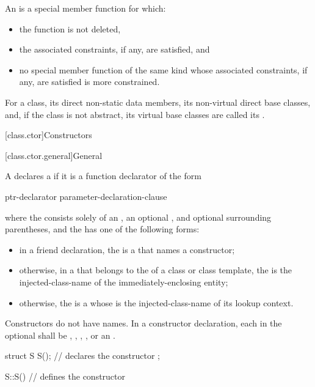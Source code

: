 \pnum
An  is a special member function for which:
\begin{itemize}
\item the function is not deleted,
\item the associated constraints, if any, are satisfied, and
\item no special member function of the same kind
whose associated constraints, if any, are satisfied
is more constrained.
\end{itemize}

\pnum
For a class, its direct non-static data members, its non-virtual direct base classes,
and, if the class is not abstract, its virtual base
classes are called its .

[class.ctor]{Constructors}%

[class.ctor.general]{General}%
%
%

\pnum
A  declares a  if it is a
function declarator of the form
\begin{ncbnf}
ptr-declarator \terminal{(} parameter-declaration-clause \terminal{)}  
\end{ncbnf}
where the  consists solely of an
, an optional ,
and optional surrounding parentheses, and the  has
one of the following forms:
\begin{itemize}
\item
in a friend declaration,
the  is a 
that names a constructor;
\item
otherwise, in a  that belongs to the
 of a class or class template,
the  is the
injected-class-name of the immediately-enclosing entity;

\item
otherwise, the
 is a 
whose  is
the injected-class-name of its lookup context.
\end{itemize}
Constructors do not have names.
In a constructor declaration, each  in the optional
 shall be
,
,
,
, or
an .
\begin{example}
\begin{codeblock}
struct S {
  S();              // declares the constructor
};

S::S() { }          // defines the constructor
\end{codeblock}
\end{example}

